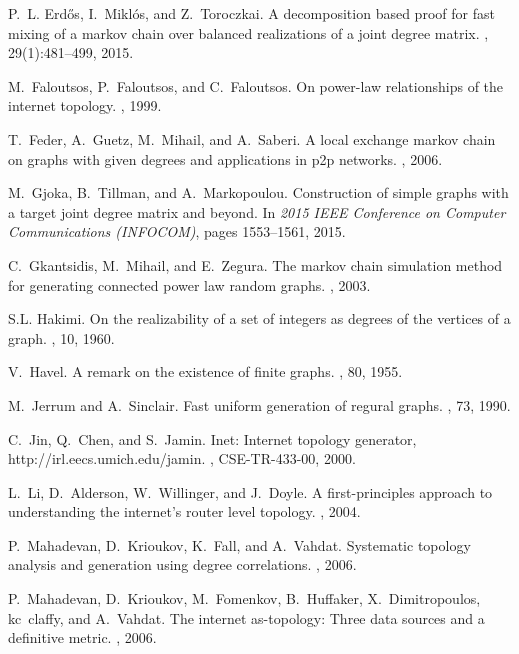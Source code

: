 \documentclass[12pt,a4paper]{article}
\theoremstyle{definition}
\theoremstyle{plain}
\begin{document}
\begin{thebibliography}{10}
P.~L. Erd\H{o}s, I.~Mikl\'{o}s, and Z.~Toroczkai.
\newblock A decomposition based proof for fast mixing of a markov chain over
  balanced realizations of a joint degree matrix.
, 29(1):481--499, 2015.

M.~Faloutsos, P.~Faloutsos, and C.~Faloutsos.
\newblock On power-law relationships of the internet topology.
, 1999.

T.~Feder, A.~Guetz, M.~Mihail, and A.~Saberi.
\newblock A local exchange markov chain on graphs with given degrees and
  applications in p2p networks.
, 2006.

M.~Gjoka, B.~Tillman, and A.~Markopoulou.
\newblock Construction of simple graphs with a target joint degree matrix and
  beyond.
\newblock In {\em 2015 IEEE Conference on Computer Communications (INFOCOM)},
  pages 1553--1561, 2015.

C.~Gkantsidis, M.~Mihail, and E.~Zegura.
\newblock The markov chain simulation method for generating connected power law
  random graphs.
, 2003.

S.L. Hakimi.
\newblock On the realizability of a set of integers as degrees of the vertices
  of a graph.
, 10, 1960.

V.~Havel.
\newblock A remark on the existence of finite graphs.
, 80, 1955.

M.~Jerrum and A.~Sinclair.
\newblock Fast uniform generation of regural graphs.
, 73, 1990.

C.~Jin, Q.~Chen, and S.~Jamin.
\newblock Inet: Internet topology generator, http://irl.eecs.umich.edu/jamin.
, CSE-TR-433-00, 2000.

L.~Li, D.~Alderson, W.~Willinger, and J.~Doyle.
\newblock A first-principles approach to understanding the internet's router
  level topology.
, 2004.

P.~Mahadevan, D.~Krioukov, K.~Fall, and A.~Vahdat.
\newblock Systematic topology analysis and generation using degree
  correlations.
, 2006.

P.~Mahadevan, D.~Krioukov, M.~Fomenkov, B.~Huffaker, X.~Dimitropoulos,
  kc~claffy, and A.~Vahdat.
\newblock The internet as-topology: Three data sources and a definitive metric.
, 2006.


\end{thebibliography}
\end{document}
